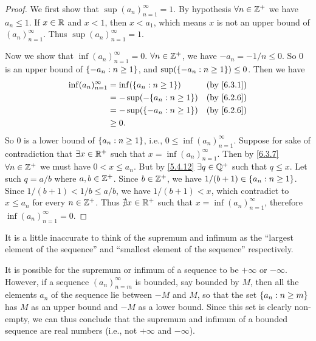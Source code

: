 \begin{proof}
  We first show that \(\sup(a_n)_{n = 1}^\infty = 1\).
  By hypothesis \(\forall n \in \mathbb{Z}^+\) we have \(a_n \leq 1\).
  If \(x \in \mathbb{R}\) and \(x < 1\), then \(x < a_1\), which means \(x\) is not an upper bound of \((a_n)_{n = 1}^\infty\).
  Thus \(\sup(a_n)_{n = 1}^\infty = 1\).

  Now we show that \(\inf(a_n)_{n = 1}^\infty = 0\).
  \(\forall n \in \mathbb{Z}^+\), we have \(-a_n = -1 / n \leq 0\).
  So \(0\) is an upper bound of \(\left\lbrace-a_n : n \geq 1\right\rbrace\), and \(\sup(\left\lbrace-a_n : n \geq 1\right\rbrace) \leq 0\).
  Then we have
  \begin{align*}
    \inf(a_n)_{n = 1}^\infty & = \inf(\set{a_n : n \geq 1})   &  & \by{6.3.1} \\
                             & = -\sup(-\set{a_n : n \geq 1}) &  & \by{6.2.6} \\
                             & = -\sup(\set{-a_n : n \geq 1}) &  & \by{6.2.6} \\
                             & \geq 0.
  \end{align*}
  So \(0\) is a lower bound of \(\left\lbrace a_n : n \geq 1\right\rbrace\), i.e., \(0 \leq \inf(a_n)_{n = 1}^\infty\).
  Suppose for sake of contradiction that \(\exists x \in \mathbb{R}^+\) such that \(x = \inf(a_n)_{n = 1}^\infty\).
  Then by \cref{6.3.7} \(\forall n \in \mathbb{Z}^+\) we must have \(0 < x \leq a_n\).
  But by \cref{5.4.12} \(\exists q \in \mathbb{Q}^+\) such that \(q \leq x\).
  Let such \(q = a / b\) where \(a, b \in \mathbb{Z}^+\).
  Since \(b \in \mathbb{Z}^+\), we have \(1 / (b + 1) \in \left\lbrace a_n : n \geq 1\right\rbrace\).
  Since \(1 / (b + 1) < 1 / b \leq a / b\), we have \(1 / (b + 1) < x\), which contradict to \(x \leq a_n\) for every \(n \in \mathbb{Z}^+\).
  Thus \(\nexists x \in \mathbb{R}^+\) such that \(x = \inf(a_n)_{n = 1}^\infty\), therefore \(\inf(a_n)_{n = 1}^\infty = 0\).
\end{proof}

\begin{note}
  It is a little inaccurate to think of the supremum and infimum as the ``largest element of the sequence'' and ``smallest element of the sequence'' respectively.
\end{note}

\begin{note}
  It is possible for the supremum or infimum of a sequence to be \(+\infty\) or \(-\infty\).
  However, if a sequence \((a_n)_{n = m}^\infty\) is bounded, say bounded by \(M\), then all the elements \(a_n\) of the sequence lie between \(-M\) and \(M\), so that the set \(\left\lbrace a_n : n \geq m\right\rbrace\) has \(M\) as an upper bound and \(-M\) as a lower bound.
  Since this set is clearly non-empty, we can thus conclude that the supremum and infimum of a bounded sequence are real numbers (i.e., not \(+\infty\) and \(-\infty\)).
\end{note}

